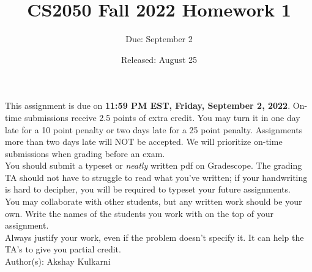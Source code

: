 \documentclass{article}
\title{CS2050 Fall 2022 Homework 1}
\author{Due: September 2}
\date{Released: August 25}
\begin{document}
\maketitle

This assignment is due on \textbf{11:59 PM EST, Friday, September 2, 2022}.  On-time submissions receive 2.5 points of extra credit. You may turn it in one day late for a 10 point penalty or two days late for a 25 point penalty. Assignments more than two days late will NOT be accepted.  We will prioritize on-time submissions when grading before an exam. \\ 

You should submit a typeset or \emph{neatly} written pdf on Gradescope.  The grading TA should not have to struggle to read what you've written; if your handwriting is hard to decipher, you will be required to typeset your future assignments.\\ 

You may collaborate with other students, but any written work should be your own. Write the names of the students you work with on the top of your assignment.\\

Always justify your work, even if the problem doesn't specify it. It can help the TA's to give you partial credit.
\\

Author(s): Akshay Kulkarni

\clearpage
\end{document}
